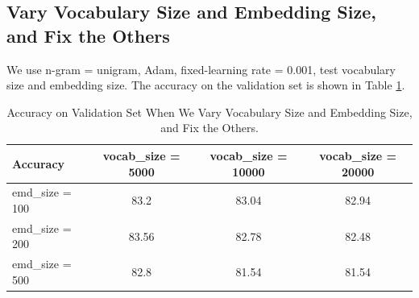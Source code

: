 \documentclass[10pt,a4paper]{article}
\begin{document}
\subsection{Vary Vocabulary Size and Embedding Size,  and Fix the Others}
We use n-gram = unigram, Adam, fixed-learning rate = 0.001, test vocabulary size and embedding size.
The accuracy on the validation set is shown in Table \ref{tab: vocab_emb}. 
\begin{table}[!ht]
\centering
\begin{tabular}{|l|c|c|c|}
\hline
Accuracy& 	vocab\_size = 5000 & vocab\_size = 10000 &vocab\_size = 20000 \\ \hline
emd\_size = 100& 83.2 & 83.04 & 82.94\\ \hline
emd\_size = 200 & 83.56 & 82.78 & 82.48\\ \hline
emd\_size = 500 & 82.8 & 81.54 & 81.54 \\ \hline
\end{tabular}
\caption{\label{tab: vocab_emb} Accuracy on Validation Set When We Vary Vocabulary Size and Embedding Size,  and Fix the Others.}
\end{table}
\end{document}
